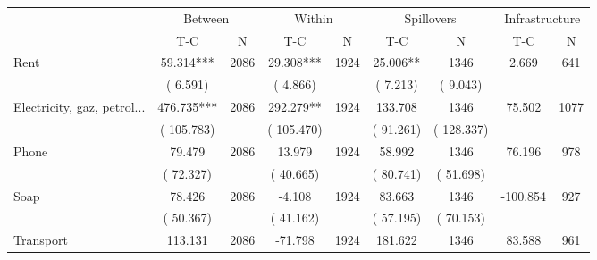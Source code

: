 
\begin{tabular}{l*{8}{c}}\hline&\multicolumn{2}{c}{Between}&\multicolumn{2}{c}{Within}&\multicolumn{2}{c}{Spillovers}&\multicolumn{2}{c}{Infrastructure}\\ \cmidrule(r){2-3}\cmidrule(l){4-5}\cmidrule(l){6-7}\cmidrule(l){8-9} & {T-C} & {N} & {T-C} & {N}  & {T-C}  & {N} & {T-C}  & {N} \\ \midrule
Rent        &             59.314***      &       2086       &             29.308***      &       1924       &             25.006**      &       1346  &        2.669 &       641       \\
                       &       (       6.591)            &                               &       (       4.866)            &                               &       (       7.213)            &       (       9.043) &                  \\
Electricity, gaz, petrol...        &            476.735***      &       2086       &            292.279**      &       1924       &            133.708      &       1346  &       75.502 &       1077       \\
                       &       (     105.783)            &                               &       (     105.470)            &                               &       (      91.261)            &       (     128.337) &                  \\
Phone        &             79.479      &       2086       &             13.979      &       1924       &             58.992      &       1346  &       76.196 &       978       \\
                       &       (      72.327)            &                               &       (      40.665)            &                               &       (      80.741)            &       (      51.698) &                  \\
Soap        &             78.426      &       2086       &             -4.108      &       1924       &             83.663      &       1346  &     -100.854 &       927       \\
                       &       (      50.367)            &                               &       (      41.162)            &                               &       (      57.195)            &       (      70.153) &                  \\
Transport        &            113.131      &       2086       &            -71.798      &       1924       &            181.622      &       1346  &       83.588 &       961       \\

\end{tabular}
